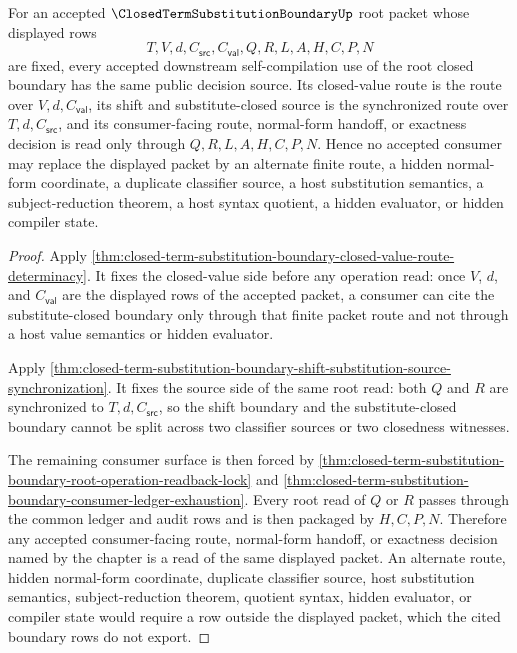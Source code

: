 \begin{corollary}
\label{cor:closed-term-substitution-boundary-root-closed-determinacy}
For an accepted $\ClosedTermSubstitutionBoundaryUp$ root packet whose displayed rows
$$
T,V,d,C_{\mathsf{src}},C_{\mathsf{val}},Q,R,L,A,H,C,P,N
$$
are fixed, every accepted downstream self-compilation use of the root closed boundary has the same public decision source. Its closed-value route is the route over $V,d,C_{\mathsf{val}}$, its shift and substitute-closed source is the synchronized route over $T,d,C_{\mathsf{src}}$, and its consumer-facing route, normal-form handoff, or exactness decision is read only through $Q,R,L,A,H,C,P,N$. Hence no accepted consumer may replace the displayed packet by an alternate finite route, a hidden normal-form coordinate, a duplicate classifier source, a host substitution semantics, a subject-reduction theorem, a host syntax quotient, a hidden evaluator, or hidden compiler state.
\end{corollary}
\begin{proof}
Apply \autoref{thm:closed-term-substitution-boundary-closed-value-route-determinacy}. It fixes the closed-value side before any operation read: once $V$, $d$, and $C_{\mathsf{val}}$ are the displayed rows of the accepted packet, a consumer can cite the substitute-closed boundary only through that finite packet route and not through a host value semantics or hidden evaluator.

Apply \autoref{thm:closed-term-substitution-boundary-shift-substitution-source-synchronization}. It fixes the source side of the same root read: both $Q$ and $R$ are synchronized to $T,d,C_{\mathsf{src}}$, so the shift boundary and the substitute-closed boundary cannot be split across two classifier sources or two closedness witnesses.

The remaining consumer surface is then forced by \autoref{thm:closed-term-substitution-boundary-root-operation-readback-lock} and \autoref{thm:closed-term-substitution-boundary-consumer-ledger-exhaustion}. Every root read of $Q$ or $R$ passes through the common ledger and audit rows and is then packaged by $H,C,P,N$. Therefore any accepted consumer-facing route, normal-form handoff, or exactness decision named by the chapter is a read of the same displayed packet. An alternate route, hidden normal-form coordinate, duplicate classifier source, host substitution semantics, subject-reduction theorem, quotient syntax, hidden evaluator, or compiler state would require a row outside the displayed packet, which the cited boundary rows do not export.
\end{proof}
